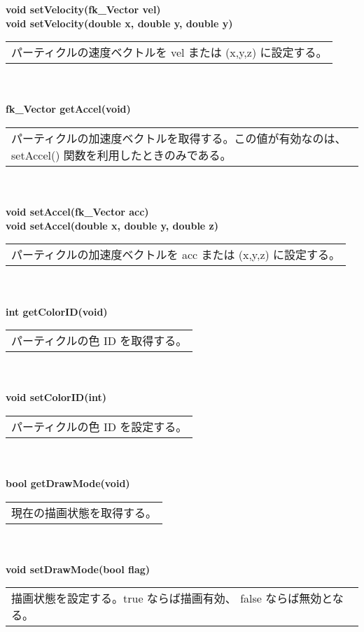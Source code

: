 \begin{tabbing}
\> \textbf{void setVelocity(fk\_Vector vel)} \\
\> \textbf{void setVelocity(double x, double y, double y)} \\
	\> \> \begin{tabular}{p{15cm}}
		パーティクルの速度ベクトルを vel または (x,y,z) に設定する。
	\end{tabular} \\ \\

\> \textbf{fk\_Vector getAccel(void)} \\
	\> \> \begin{tabular}{p{15cm}}
		パーティクルの加速度ベクトルを取得する。この値が有効なのは、
		setAccel() 関数を利用したときのみである。
	\end{tabular} \\ \\

\> \textbf{void setAccel(fk\_Vector acc)} \\
\> \textbf{void setAccel(double x, double y, double z)} \\
	\> \> \begin{tabular}{p{15cm}}
		パーティクルの加速度ベクトルを
		acc または (x,y,z) に設定する。
	\end{tabular} \\ \\

\> \textbf{int getColorID(void)} \\
	\> \> \begin{tabular}{p{15cm}}
		パーティクルの色 ID を取得する。
	\end{tabular} \\ \\

\> \textbf{void setColorID(int)} \\
	\> \> \begin{tabular}{p{15cm}}
		パーティクルの色 ID を設定する。
	\end{tabular} \\ \\

\> \textbf{bool getDrawMode(void)} \\
	\> \> \begin{tabular}{p{15cm}}
		現在の描画状態を取得する。
	\end{tabular} \\ \\

\> \textbf{void setDrawMode(bool flag)} \\
	\> \> \begin{tabular}{p{15cm}}
		描画状態を設定する。true ならば描画有効、
		false ならば無効となる。
	\end{tabular}
\end{tabbing}
